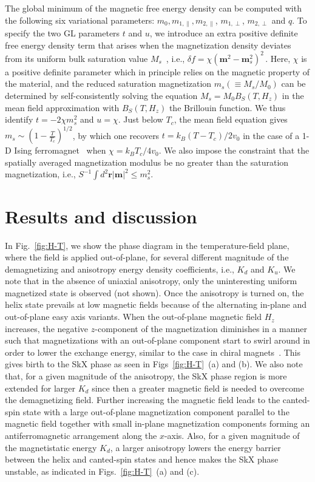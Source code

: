 \documentclass[10pt,onecolumn,prb,aps,notitlepage]{revtex4}
\begin{document}
The global minimum of the magnetic free energy density can be computed with the following six variational parameters: $%
m_{0}, m_{1,\parallel }, m_{2,\parallel }$, $m_{1,\perp }$, $m_{2,\perp }$ and $%
q$. To specify the two GL
parameters $t$ and $u$, we introduce an extra positive definite free energy density term that arises when  the
magnetization density deviates from its uniform bulk saturation value $M_s$~\cite{jWang13IJSS_GL-penalty-func,Landis08JMPS_GL-penalty-func}, i.e., $
\delta f=\chi \left( \mathbf{m}^{2}-\mathbf{m}_{s}^{2}\right) ^{2}\,.
$
Here, $\chi$ is a positive definite parameter which in principle relies on the magnetic property of the material, and the reduced saturation magnetization $m_s(\equiv M_s/M_0)$ can be
determined by self-consistently solving the equation $M_{s}=M_{0}B_{S}\left(
T,H_{z}\right) $ in the mean field approximation with $B_{S}\left(
T,H_{z}\right) $ the Brillouin function. We thus identify $t=-2\chi
m_{s}^{2}$ and $u=\chi$. Just below $%
T_{c}$, the mean field equation gives $m_{s}\sim (1-\frac{T}{T_{c}})^{1/2}$,
by which one recovers $%
t=k_B\left( T-T_{c}\right)/2v_0 $ in the case of a 1-D Ising ferromagnet~\cite{Garel82PRB_Ginzberg-Landau} when $\chi =k_B T_{c}/4v_0$. We also impose the constraint that the spatially averaged
magnetization modulus be no greater than the saturation magnetization,
i.e., $S^{-1}\int d^{2}\mathbf{r}\left\vert \mathbf{m}\right\vert ^{2}\leq
m_{s}^{2}$.

\section{Results and discussion}
In Fig.~\ref{fig:H-T}, we show the phase diagram in the temperature-field plane, where the field is applied out-of-plane,
for several different magnitude
of the demagnetizing and anisotropy energy density coefficients, i.e., $%
K_{d} $ and $K_{u}$. We note that in the absence of uniaxial anisotropy,
only the uninteresting uniform magnetized state is observed (not shown).
Once the anisotropy is turned on, the helix state prevails at low magnetic
fields because of the alternating in-plane and out-of-plane easy axis variants.
When the out-of-plane magnetic field $H_{z}$ increases, the negative $z$-component
of the magnetization diminishes in a manner such that magnetizations with
an out-of-plane component start to swirl around in order to lower the exchange
energy, similar to the case in chiral magnets~\cite{Nagaosa13Nat.Nano_Skyrmion}.  This gives birth to the
SkX phase as seen in Figs~\ref{fig:H-T}~(a) and (b). We also note that, for
a given magnitude of the anisotropy, the SkX phase region is more extended
for larger $K_{d}$ since then a greater magnetic field is needed to overcome the
demagnetizing field. Further increasing the magnetic field leads to the
canted-spin state with a large out-of-plane magnetization component parallel
to the magnetic field together with small in-plane magnetization components forming an
antiferromagnetic arrangement along the $x$-axis. Also, for a given magnitude of the magnetistatic energy $%
K_{d}$, a larger anisotropy lowers the energy barrier between the helix and
canted-spin states and hence makes the SkX phase unstable, as indicated in
Figs.~\ref{fig:H-T}~(a) and (c).
\end{document}
